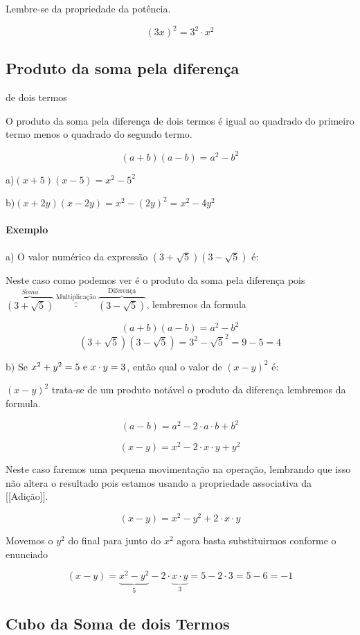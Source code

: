 \documentclass[letterpaper]{book}
\begin{document}
Lembre-se da propriedade da potência.

\[(3x)^{2} = 3^{2} \cdot x^{2}\]

\subsection{Produto da soma pela diferença} de dois termos

O produto da soma pela diferença de dois termos é igual ao quadrado do primeiro termo menos o quadrado do segundo termo.

\[(a + b)(a - b) = a^{2} - b^{2}\]


a)\((x + 5)(x - 5) = x^{2}-5^{2}\)

b)\((x + 2y)(x - 2y) = x^{2} - (2y)^{2} = x^{2} - 4y^{2}\)


\paragraph{Exemplo}

a) O valor numérico da expressão \((3 + \sqrt{5})(3-\sqrt{5})\) é:

Neste caso como podemos ver é o produto da soma pela diferença pois 
\(\overbrace{(3 + \sqrt{5})}^{Soma}\overbrace{\cdot}^{\text{Multiplicação}}\overbrace{(3-\sqrt{5})}^{\text{Diferença}}\), lembremos da formula

\[(a + b)(a - b) = a^{2} - b^{2}\]
\[(3 + \sqrt{5})(3-\sqrt{5}) = 3^{2} - \sqrt{5}^{2} = 9 - 5 = 4\]

b) Se \(x^{2} + y^{2} = 5$ e $x \cdot y = 3\), então qual o valor de \((x-y)^{2}\) é:

$(x-y)^{2}$ trata-se de um produto notável o produto da diferença lembremos da formula.

\[(a - b) = a^{2} - 2 \cdot a \cdot b + b^{2}\]

\[(x - y) = x^{2} - 2 \cdot x \cdot y + y^{2}\]

Neste caso faremos uma pequena movimentação na operação, lembrando que isso não altera o resultado pois estamos usando a propriedade associativa da [[Adição]].

\[(x-y) = x^{2} - y^{2} + 2 \cdot x \cdot y\]

Movemos o \(y^{2}\) do final para junto do \(x^{2}\) agora basta substituirmos conforme o enunciado

\[(x-y) = \underbrace{x^{2} - y^{2}}_{5} - 2 \cdot \underbrace{ x \cdot y}_{3} = 5 - 2 \cdot 3 = 5 - 6 = -1\]

\subsection{Cubo da Soma de dois Termos}
\end{document}
